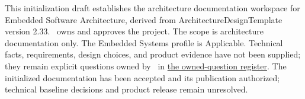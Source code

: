 This initialization draft establishes the architecture documentation workspace
for Embedded Software Architecture, derived from ArchitectureDesignTemplate
version 2.33. \DocumentOwner\ owns and approves the project. The scope is
architecture documentation only. The Embedded Systems profile is Applicable.
Technical facts, requirements, design choices, and product evidence have not
been supplied; they remain explicit questions owned by \DocumentOwner\ in
\hyperref[Section:OwnedQuestions]{the owned-question register}. The initialized documentation has been accepted and its publication authorized;
technical baseline decisions and product release remain unresolved.

